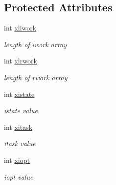\subsection*{Protected Attributes}
\begin{DoxyCompactItemize}
\item 
\mbox{\label{classodepack__dlsoda_a6c98ce6ec86aae4fea34ed04230bf0f8}} 
int \hyperlink{classodepack__dlsoda_a6c98ce6ec86aae4fea34ed04230bf0f8}{xliwork}
\begin{DoxyCompactList}\small\item\em length of iwork array \end{DoxyCompactList}\item 
\mbox{\label{classodepack__dlsoda_a14a08a08073c9013bdac66a5addaac88}} 
int \hyperlink{classodepack__dlsoda_a14a08a08073c9013bdac66a5addaac88}{xlrwork}
\begin{DoxyCompactList}\small\item\em length of rwork array \end{DoxyCompactList}\item 
\mbox{\label{classodepack__dlsoda_a839d1d413392db48d73f8442d2a5f162}} 
int \hyperlink{classodepack__dlsoda_a839d1d413392db48d73f8442d2a5f162}{xistate}
\begin{DoxyCompactList}\small\item\em istate value \end{DoxyCompactList}\item 
\mbox{\label{classodepack__dlsoda_a169bda738ab8d3200068109d18ce6bbf}} 
int \hyperlink{classodepack__dlsoda_a169bda738ab8d3200068109d18ce6bbf}{xitask}
\begin{DoxyCompactList}\small\item\em itask value \end{DoxyCompactList}\item 
\mbox{\label{classodepack__dlsoda_a4b57efab0a49bc331ef04d65f0da60bc}} 
int \hyperlink{classodepack__dlsoda_a4b57efab0a49bc331ef04d65f0da60bc}{xiopt}
\begin{DoxyCompactList}\small\item\em iopt value \end{DoxyCompactList}\item 

\end{DoxyCompactItemize}
